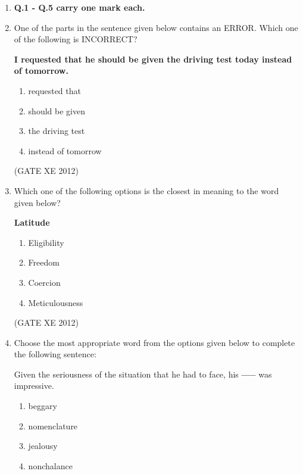 \documentclass[12pt]{article}
\begin{document}
\begin{enumerate}

\item[] \textbf{Q.1 - Q.5 carry one mark each.}

\item One of the parts in the sentence given below contains an ERROR.  
Which one of the following is INCORRECT?  

\textbf{I requested that he should be given the driving test today instead of tomorrow.}  

\begin{enumerate}
\item requested that
\item should be given
\item the driving test
\item instead of tomorrow
\end{enumerate}

(GATE XE 2012)

\item Which one of the following options is the closest in meaning to the word given below?  

\textbf{Latitude}  

\begin{multicols}{4}
\begin{enumerate}
\item Eligibility
\item Freedom
\item Coercion
\item Meticulousness
\end{enumerate}
\end{multicols}

(GATE XE 2012)

\item Choose the most appropriate word from the options given below to complete the following sentence:  

Given the seriousness of the situation that he had to face, his \textbf{-----} was impressive.  

\begin{multicols}{4}
\begin{enumerate}
\item beggary
\item nomenclature
\item jealousy
\item nonchalance
\end{enumerate}
\end{multicols}


\end{enumerate}
\end{document}
